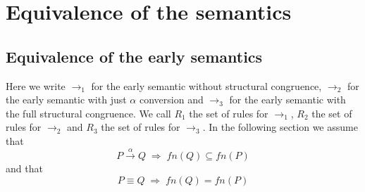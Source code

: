 \section{Equivalence of the semantics}
\subsection{Equivalence of the early semantics}
Here we write $\rightarrow_{1}$ for the early semantic without structural congruence, $\rightarrow_{2}$ for the early semantic with just $\alpha$ conversion and $\rightarrow_{3}$ for the early semantic with the full structural congruence. We call $R_{1}$ the set of rules for $\rightarrow_{1}$, $R_{2}$ the set of rules for $\rightarrow_{2}$ and $R_{3}$ the set of rules for $\rightarrow_{3}$. In the following section we assume that 
\[
  P\xrightarrow{\alpha}Q\; \Rightarrow\; fn(Q)\subseteq fn(P)
\]
and that 
\[
  P\equiv Q\; \Rightarrow\; fn(Q)= fn(P)
\]


